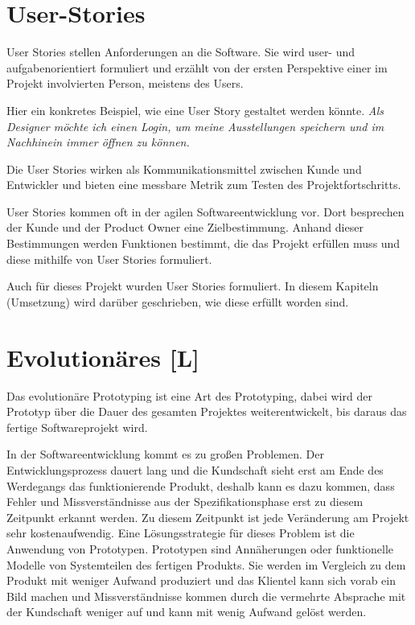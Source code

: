 \section{User-Stories}
User Stories stellen Anforderungen an die Software. Sie wird user- und aufgabenorientiert formuliert und erzählt von der ersten Perspektive einer im Projekt involvierten Person, meistens des Users.

Hier ein konkretes Beispiel, wie eine User Story gestaltet werden könnte.
\emph{Als Designer möchte ich einen Login, um meine Ausstellungen speichern und im Nachhinein immer öffnen zu können.}

Die User Stories wirken als Kommunikationsmittel zwischen Kunde und Entwickler und bieten eine messbare Metrik zum Testen des Projektfortschritts.

User Stories kommen oft in der agilen Softwareentwicklung vor. Dort besprechen der Kunde und der Product Owner eine Zielbestimmung. Anhand dieser Bestimmungen werden Funktionen bestimmt, die das Projekt erfüllen muss und diese mithilfe von User Stories formuliert.
\cite{AgileVorgehensmodelle}

Auch für dieses Projekt wurden User Stories formuliert. In diesem Kapiteln (Umsetzung) wird darüber geschrieben, wie diese erfüllt worden sind. 



\section{Evolutionäres  [L]}
\label{ch::ongoing-prototyping}
Das evolutionäre Prototyping ist eine Art des Prototyping, dabei wird der Prototyp über die Dauer des gesamten Projektes weiterentwickelt, bis daraus das fertige Softwareprojekt wird.

In der Softwareentwicklung kommt es zu großen Problemen. Der Entwicklungsprozess dauert lang und die Kundschaft sieht erst am Ende des Werdegangs das funktionierende Produkt, deshalb kann es dazu kommen, dass Fehler und Missverständnisse aus der Spezifikationsphase erst zu diesem Zeitpunkt erkannt werden. Zu diesem Zeitpunkt ist jede Veränderung am Projekt sehr kostenaufwendig. Eine Lösungsstrategie für dieses Problem ist die Anwendung von Prototypen. Prototypen sind Annäherungen oder funktionelle Modelle von Systemteilen des fertigen Produkts. Sie werden im Vergleich zu dem Produkt mit weniger Aufwand produziert und das Klientel kann sich vorab ein Bild machen und Missverständnisse kommen durch die vermehrte Absprache mit der Kundschaft weniger auf und kann mit wenig Aufwand gelöst werden. \cite{Prototyping}

